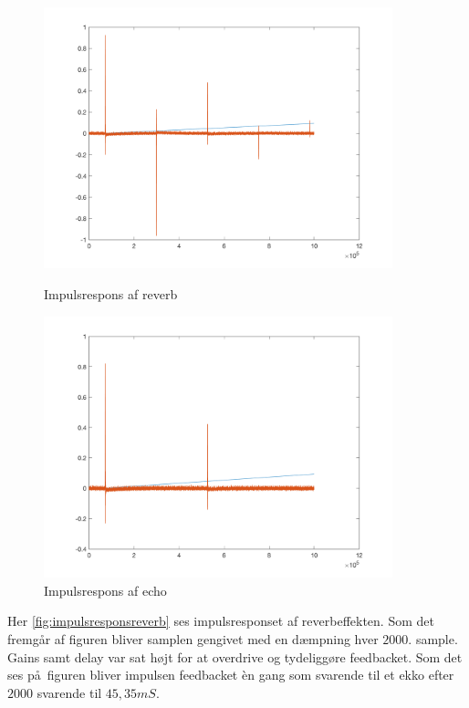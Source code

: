 \begin{figure}[!ht]
	\centering
	\begin{minipage}{0.50\textwidth}
		\centering
	\includegraphics[width=0.9\textwidth]{billeder/reverb_res.png}
	\caption{Impulsrespons af reverb}
	\label{fig:impulsresponsreverb}
	\end{minipage}\hfill
	\begin{minipage}{0.50\textwidth}
		\includegraphics[width=0.9\textwidth]{billeder/echo_res.png}
		\caption{Impulsrespons af echo}
		\label{fig:impulsresponsecho}
		\end{minipage}
\end{figure}
Her \ref{fig:impulsresponsreverb} ses impulsresponset af reverbeffekten.
Som det fremgår af figuren bliver samplen gengivet med en dæmpning hver $2000$. sample.
Gains samt delay var sat højt for at overdrive og tydeliggøre feedbacket.\newline
Som det ses på figuren bliver impulsen feedbacket èn gang som svarende til et ekko efter $2000$ svarende til $45,35\si{mS}$.

